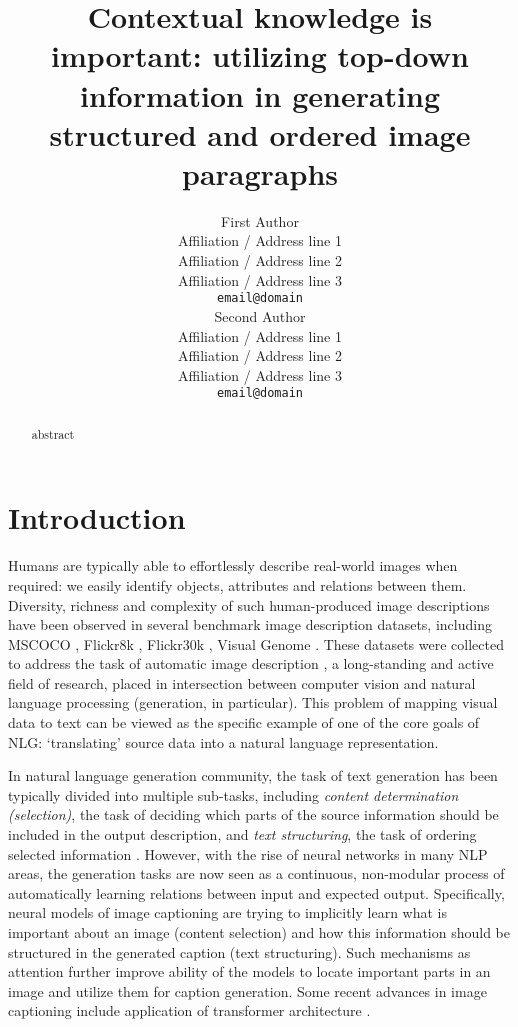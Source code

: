 \documentclass[11pt,a4paper]{article}
\title{Contextual knowledge is important: utilizing top-down information in generating structured and ordered image paragraphs}
\author{First Author \\
  Affiliation / Address line 1 \\
  Affiliation / Address line 2 \\
  Affiliation / Address line 3 \\
  \texttt{email@domain} \\\And
  Second Author \\
  Affiliation / Address line 1 \\
  Affiliation / Address line 2 \\
  Affiliation / Address line 3 \\
  \texttt{email@domain} \\}
\date{}
\begin{document}
\maketitle
\begin{abstract}
abstract

\end{abstract}

\section{Introduction}



Humans are typically able to effortlessly describe real-world images when required: we easily identify objects, attributes and relations between them.
Diversity, richness and complexity of such human-produced image descriptions have been observed in several benchmark image description datasets, including MSCOCO \cite{lin2014microsoft,chen2015microsoft}, Flickr8k \cite{hodosh2013}, Flickr30k \cite{young-etal-2014-image}, Visual Genome \cite{krishnavisualgenome}.
These datasets were collected to address the task of automatic image description \cite{bernardi2016automatic}, a long-standing and active field of research, placed in intersection between computer vision and natural language processing (generation, in particular).
This problem of mapping visual data to text can be viewed as the specific example of one of the core goals of NLG: `translating' source data into a natural language representation.

In natural language generation community, the task of text generation has been typically divided into multiple sub-tasks, including \textit{content determination (selection)}, the task of deciding which parts of the source information should be included in the output description, and \textit{text structuring}, the task of ordering selected information \cite{Gatt2017}.
However, with the rise of neural networks in many NLP areas, the generation tasks are now seen as a continuous, non-modular process of automatically learning relations between input and expected output. Specifically, neural models of image captioning \cite{kiros14,vinyals2014tell} are trying to implicitly learn what is important about an image (content selection) and how this information should be structured in the generated caption (text structuring).
Such mechanisms as attention \cite{xu2015attend,anderson2017bottomup} further improve ability of the models to locate important parts in an image and utilize them for caption generation. Some recent advances in image captioning include application of transformer architecture \cite{vaswani2017attention,herdade2019image}.
\end{document}

